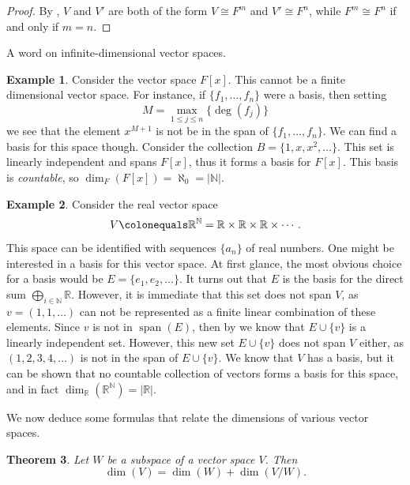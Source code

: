\documentclass[12pt]{report}
\newtheorem{theorem}{Theorem}[chapter]
\numberwithin{equation}{section}
\numberwithin{theorem}{chapter}
\theoremstyle{definition}
\newtheorem{example}[theorem]{Example}
\newtheorem*{basic properties}{Basic Properties}
\newtheorem*{Important Remark}{Important Remark}
\newcommand{\R}{\mathbb{R}}
\newcommand{\N}{\mathbb{N}}
\DeclareMathOperator{\Span}{span}
\begin{document}
\begin{proof}
	By , $V$ and $V'$ are both of the form $V \cong F^m$ and $V'\cong F^n$, while $F^m \cong F^n$ if and only if $m=n$.
\end{proof}

A word on infinite-dimensional vector spaces.
 
\begin{example}\label{F[x] infinite dim}
Consider the vector space $F[x]$. This cannot be a finite dimensional vector space. For instance, if $\{f_1 , \dots , f_n\}$ were a basis, then setting
$$M = \max_{1 \leqslant j \leqslant n}\{ \deg(f_j)\}$$
we see that the element $x^{M+1}$ is not be in the span of $\{f_1 , \dots , f_n\}$. We can find a basis for this space though. Consider the collection $B = \{1, x, x^2 , \ldots \}$. This set is linearly independent and spans $F[x]$, thus it forms a basis for $F[x]$. This basis is {\em countable}, so $\dim_F(F[x])= \aleph_0 = |\N|$.
\end{example}

\begin{example}
Consider the real vector space 
$$V \colonequals \R^\N = \R\times \R\times \R \times \cdots.$$ 
This space can be identified with sequences $\{a_n\}$ of real numbers. One might be interested in a basis for this vector space. At first glance, the most obvious choice for a basis would be $E = \{e_1,e_2,\ldots\}$. It turns out that $E$ is the basis for the direct sum $\bigoplus_{i\in \N}\R$. However, it is immediate that this set does not span $V$, as $v = (1,1,\ldots)$ can not be represented as a finite linear combination of these elements. Since $v$ is not in $\Span(E)$, then by  we know that $E \cup \{v\}$ is a linearly independent set. However, this new set $E \cup \{v\}$ does not span $V$ either, as $(1, 2, 3, 4, \ldots)$ is not in the span of $E \cup \{v\}$. We know that $V$ has a basis, but it can be shown that no countable collection of vectors forms a basis for this space, and in fact $\dim_\R (\R^\N) =|\R|$. 
\end{example}

 
We now deduce some formulas that relate the dimensions of various vector spaces.
 
 
 
\begin{theorem}\label{dimension formula subspaces}
 Let $W$ be a subspace of a vector space $V$. Then 
 $$\dim(V) = \dim(W) + \dim(V/W).$$
 \end{theorem}
 
\end{document}
